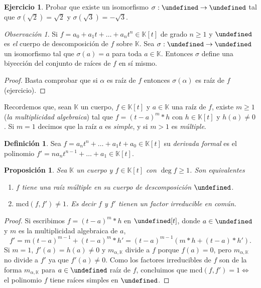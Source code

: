 \documentclass[10pt, spanish]{report}
\newtheorem{prop}[tma]{Proposición}
\theoremstyle{definition}
\newtheorem*{defin}{Definición}
\theoremstyle{custom}
\newtheorem*{ejer}{Ejercicio}
\theoremstyle{remark}
\newtheorem*{obs}{Observación}
\newcommand{\K}{\mathbb{K}}
\let\L\undefined
\newcommand{\L}{\mathbb{L}}
\newcommand{\mcd}[1]{\text{mcd}(#1)}
\renewcommand{\geq}{\geqslant}
\newcommand{\fecha}[1]{\marginpar{\underline{\footnotesize{#1}}}}
\begin{document}
\begin{ejer}
    Probar que existe un isomorfismo $\sigma:\L\to\L$ tal que
    $\sigma(\sqrt{2})=\sqrt{2}$ y $\sigma(\sqrt{3})=-\sqrt{3}$.
\end{ejer}

\begin{obs}
    Si $f=a_0+a_1t+\ldots+a_nt^n\in\K[t]$ de grado $n\geq1$ y $\L$ es
    \textit{el} cuerpo de descomposición de $f$ sobre $\K$. Sea $\sigma:\L\to\L$
    un isomorfismo tal que $\sigma(a)=a$ para toda $a\in\K$. Entonces $\sigma$
    define una biyección del conjunto de raíces de $f$ en sí mismo.
\end{obs}
\begin{proof}
    Basta comprobar que si $\alpha$ es raíz de $f$ entonces $\sigma(\alpha)$ es
    raíz de $f$ (ejercicio).
\end{proof}

\fecha{11/03}

Recordemos que, sean $\K$ un cuerpo, $f\in\K[t]$ y $a\in\K$ una raíz de $f$,
existe $m\geq1$ (\textit{la multiplicidad algebraica}) tal que $f=(t-a)^m*h$ con
$h\in\K[t]$ y $h(a)\neq0$. Si $m=1$ decimos que la raíz $a$ es \textit{simple},
y si $m>1$ es \textit{múltiple}.

\begin{defin}
    Sea $f=a_nt^n+\ldots+a_1t+a_0\in\K[t]$ su \textit{derivada formal} es el
   polinomio $f'=na_nt^{n-1}+\ldots+a_1\in\K[t]$.
\end{defin}

\begin{prop}
    Sea $\K$ un cuerpo y $f\in\K[t]$ con $\deg{f}\geq1$. Son equivalentes
    \begin{enumerate}
        \item $f$ tiene una raíz múltiple en su cuerpo de descomposición $\L$.
        \item $\mcd{f,f'}\neq 1$. Es decir $f$ y $f'$ tienen un factor
            irreducible en común.
    \end{enumerate}
\end{prop}

\begin{proof}
    Si escribimos $f=(t-a)^m*h$ en $\L[t]$, donde $a\in\L$ y $m$ es la
    multiplicidad algebraica de $a$,
    \[f'=m(t-a)^{m-1}+(t-a)^m*h'=(t-a)^{m-1}(m*h+(t-a)*h').\]
    Si $m=1$, $f'(a)=h(a)\neq 0$ y $m_{\alpha,\K}$ divide a $f$ porque $f(a)=0$,
    pero $m_{\alpha,\K}$ no divide a $f'$ ya que $f'(a)\neq 0$. Como los
    factores irreducibles de $f$ son de la forma $m_{\alpha,\K}$ para $a\in\L$
    raíz de $f$, concluimos que $\mcd{f,f'}=1\Leftrightarrow$ el polinomio $f$
    tiene raíces simples en $\L$.
\end{proof}
\end{document}
